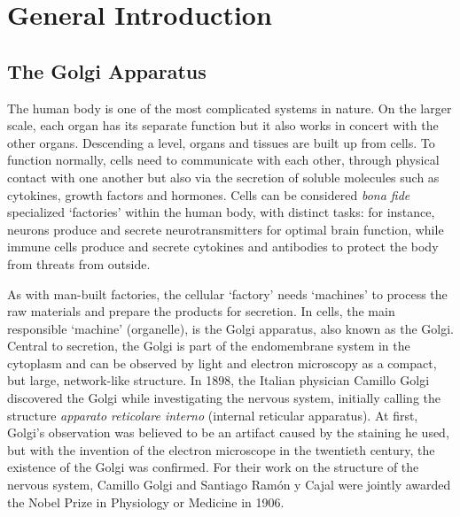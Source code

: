 
\stopthumb




\thispagestyle{empty}
\begin{savequote}

\end{savequote}
\chapter{General Introduction}
\thispagestyle{empty}
\clearpage

\thispagestyle{fancy}
\continuethumb
\section{The Golgi Apparatus}
The human body is one of the most complicated systems in nature. On the larger scale, each organ has its separate function but it also works in concert with the other organs. Descending a level, organs and tissues are built up from cells. To function normally, cells need to communicate with each other, through physical contact with one another but also via the secretion of soluble molecules such as cytokines, growth factors and hormones. Cells can be considered \emph{bona fide} specialized ‘factories’ within the human body, with distinct tasks: for instance, neurons produce and secrete neurotransmitters for optimal brain function, while immune cells produce and secrete cytokines and antibodies to protect the body from threats from outside.

As with man-built factories, the cellular ‘factory’ needs ‘machines’ to process the raw materials and prepare the products for secretion. In cells, the main responsible ‘machine’ (organelle), is the Golgi apparatus, also known as the Golgi. Central to secretion, the Golgi is part of the endomembrane system in the cytoplasm and can be observed by light and electron microscopy as a compact, but large, network-like structure. In 1898, the Italian physician Camillo Golgi discovered the Golgi while investigating the nervous system, initially calling the structure \emph{apparato reticolare interno} (internal reticular apparatus)\cite{droscher_history_1998,fabene_1898-1998_1998}. At first, Golgi’s observation was believed to be an artifact caused by the staining he used, but with the invention of the electron microscope in the twentieth century, the existence of the Golgi was confirmed\cite{davidson_molecular_nodate}. For their work on the structure of the nervous system, Camillo Golgi and Santiago Ramón y Cajal were jointly awarded the Nobel Prize in Physiology or Medicine in 1906\cite{noauthor_nobel_nodate}.

